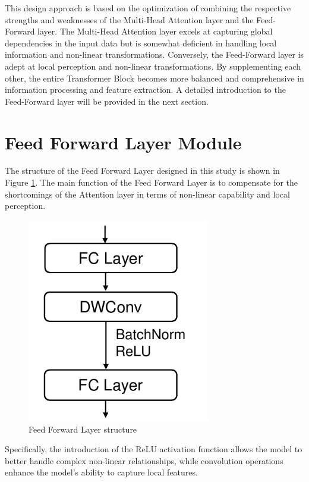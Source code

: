 \documentclass[12pt]{report}
\begin{document}
This design approach is based on the optimization of combining the respective strengths and weaknesses of the Multi-Head Attention layer and the Feed-Forward layer. The Multi-Head Attention layer excels at capturing global dependencies in the input data but is somewhat deficient in handling local information and non-linear transformations. Conversely, the Feed-Forward layer is adept at local perception and non-linear transformations. By supplementing each other, the entire Transformer Block becomes more balanced and comprehensive in information processing and feature extraction. A detailed introduction to the Feed-Forward layer will be provided in the next section.
\section{Feed Forward Layer Module }
The structure of the Feed Forward Layer designed in this study is shown in Figure \ref{fig:FFL}. The main function of the Feed Forward Layer is to compensate for the shortcomings of the Attention layer in terms of non-linear capability and local perception.

\begin{figure}[thbp]
    \centering
    \includegraphics[width=8cm]{image/FFL.pdf}
    \caption{Feed Forward Layer structure}
    \label{fig:FFL}
\end{figure}

Specifically, the introduction of the ReLU activation function allows the model to better handle complex non-linear relationships, while convolution operations enhance the model's ability to capture local features.
\end{document}
